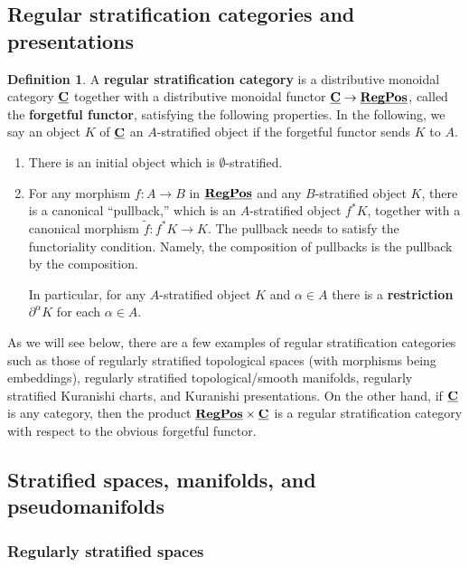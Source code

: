 \documentclass[reqno, 10pt]{amsart}
\numberwithin{equation}{section}
\numberwithin{equation}{section}
\theoremstyle{definition}
\newtheorem{defn}[thm]{Definition}
\theoremstyle{remark}
\newcommand{\regpos}{\uds{\bf RegPos}}
\newcommand{\uds}[1]{\underline{\smash{#1}}}
\begin{document}
\subsection{Regular stratification categories and presentations}

\begin{defn}\label{defn_regular_stratification_category}
A {\bf regular stratification category} is a distributive monoidal category $\uds{\bf C}$ together with a distributive monoidal functor $\uds{\bf C} \to \regpos$, called the {\bf forgetful functor}, satisfying the following properties. In the following, we say an object $K$ of $\uds{\bf C}$ an $A$-stratified object if the forgetful functor sends $K$ to $A$.
\begin{enumerate}

\item There is an initial object which is $\emptyset$-stratified. 

\item For any morphism $f: A \to B$ in $\regpos$ and any $B$-stratified object $K$, there is a canonical ``pullback,'' which is an $A$-stratified object $f^* K$, together with a canonical morphism $\tilde f: f^* K \to K$. The pullback needs to satisfy the functoriality condition. Namely, the composition of pullbacks is the pullback by the composition.

In particular, for any $A$-stratified object $K$ and $\alpha \in A$ there is a {\bf restriction} $\partial^\alpha K$ for each $\alpha \in A$.
\end{enumerate}
\end{defn}

As we will see below, there are a few examples of regular stratification categories such as those of regularly stratified topological spaces (with morphisms being embeddings), regularly stratified topological/smooth manifolds, regularly stratified Kuranishi charts, and Kuranishi presentations. On the other hand, if $\uds{\bf C}$ is any category, then the product $\uds{\bf RegPos}\times \uds{\bf C}$ is a regular stratification category with respect to the obvious forgetful functor.


\subsection{Stratified spaces, manifolds, and pseudomanifolds}

\subsubsection{Regularly stratified spaces}
\end{document}
